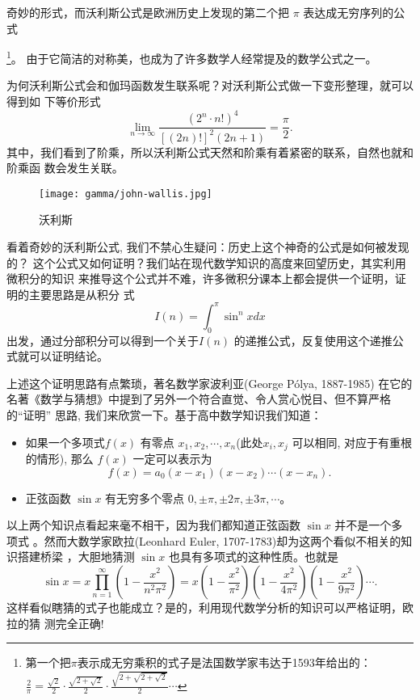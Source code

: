奇妙的形式，而沃利斯公式是欧洲历史上发现的第二个把 $\pi$ 表达成无穷序列的公式{
\footnote{第一个把$\pi$表示成无穷乘积的式子是法国数学家韦达于1593年给出的：
${\frac {2}{\pi }}={\frac {\sqrt {2}}{2}}\cdot {\frac {\sqrt {2+{\sqrt {2}}}}{2}}\cdot {\frac {\sqrt {2+{\sqrt {2+{\sqrt {2}}}}}}{2}}\cdots $
}。
由于它简洁的对称美，也成为了许多数学人经常提及的数学公式之一。

为何沃利斯公式会和伽玛函数发生联系呢？对沃利斯公式做一下变形整理，就可以得到如
下等价形式
$$ \lim_{n\rightarrow\infty} \frac{(2^n \cdot n!)^4}{[(2n)!]^2(2n+1)} = \frac{\pi}{2} .$$
其中，我们看到了阶乘，所以沃利斯公式天然和阶乘有着紧密的联系，自然也就和阶乘函
数会发生关联。

\begin{figure}[htbp]
\centering
\texttt{[image: gamma/john-wallis.jpg]}
\caption{沃利斯}
\end{figure}

看着奇妙的沃利斯公式, 我们不禁心生疑问：历史上这个神奇的公式是如何被发现的？
这个公式又如何证明？我们站在现代数学知识的高度来回望历史，其实利用微积分的知识
来推导这个公式并不难，许多微积分课本上都会提供一个证明，证明的主要思路是从积分
式 $$ I(n) = \int_0^\pi \sin^nxdx $$ 出发，通过分部积分可以得到一个关于$I(n)$
的递推公式，反复使用这个递推公式就可以证明结论。 

上述这个证明思路有点繁琐，著名数学家波利亚(George P\'{o}lya, 1887-1985) 在它的
名著《数学与猜想》中提到了另外一个符合直觉、令人赏心悦目、但不算严格的“证明”
思路, 我们来欣赏一下。基于高中数学知识我们知道：
\begin{itemize}
\item 如果一个多项式$f(x)$ 有零点 $x_1, x_2, \cdots,
x_n$(此处$x_i, x_j$ 可以相同, 对应于有重根的情形), 那么 $f(x)$ 一定可以表示为 
$$ f(x) = a_0 (x-x_1) (x-x_2) \cdots (x-x_n) .$$ 
\item 正弦函数 $\sin x$ 有无穷多个零点 $0, \pm\pi, \pm 2\pi, \pm 3\pi, \cdots $。 
\end{itemize}
以上两个知识点看起来毫不相干，因为我们都知道正弦函数 $\sin x$ 并不是一个多项式
。然而大数学家欧拉(Leonhard Euler, 1707-1783)却为这两个看似不相关的知识搭建桥梁
，大胆地猜测 $\sin x$ 也具有多项式的这种性质。也就是
\begin{equation}
\label{euler-sinx}
\sin x = x \prod_{n=1}^\infty\left(1 - \frac{x^2}{n^2\pi^2}\right) 
= x (1- \frac{x^2}{\pi^2})  (1- \frac{x^2}{4\pi^2})  (1- \frac{x^2}{9\pi^2}) \cdots .
\end{equation}
这样看似瞎猜的式子也能成立？是的，利用现代数学分析的知识可以严格证明，欧拉的猜
测完全正确!  

}
